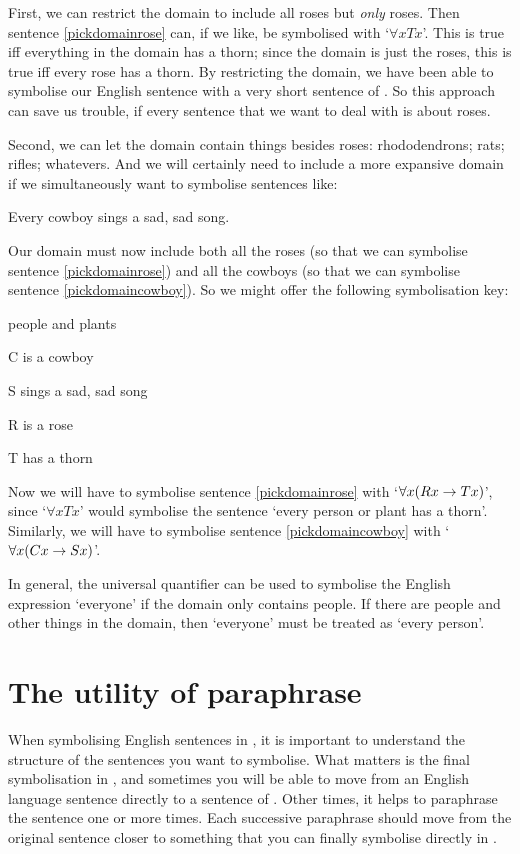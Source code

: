 First, we can restrict the domain to include all roses but \emph{only} roses. Then sentence \ref{pickdomainrose} can, if we like, be symbolised with `$\forall x Tx$'. This is true iff everything in the domain has a thorn; since the domain is just the roses, this is true iff every rose has a thorn. By restricting the domain, we have been able to symbolise our English sentence with a very short sentence of \FOL. So this approach can save us trouble, if every sentence that we want to deal with is about roses.

Second, we can let the domain contain things besides roses: rhododendrons; rats; rifles; whatevers.  And we will certainly need to include a more expansive domain if we simultaneously want to symbolise sentences like:
	\begin{earg}
		\item[\ex{pickdomaincowboy}] Every cowboy sings a sad, sad song.
	\end{earg}
Our domain must now include both all the roses (so that we can symbolise sentence \ref{pickdomainrose}) and all the cowboys (so that we can symbolise sentence \ref{pickdomaincowboy}). So we might offer the following symbolisation key:
	\begin{ekey}
		\item[\text{domain}] people and plants
		\item[C\meta{x}]  is a cowboy
		\item[S\meta{x}]  sings a sad, sad song
		\item[R\meta{x}]  is a rose
		\item[T\meta{x}]  has a thorn
	\end{ekey}
Now we will have to symbolise sentence \ref{pickdomainrose} with `$\forall x (Rx \rightarrow Tx)$', since `$\forall x Tx$' would symbolise the sentence `every person or plant has a thorn'. Similarly, we will have to symbolise sentence \ref{pickdomaincowboy} with `$\forall x (Cx \rightarrow Sx)$'. 

In general, the universal quantifier can be used to symbolise the English expression `everyone' if the domain only contains people. If there are people and other things in the domain, then `everyone' must be treated as `every person'.


\section{The utility of paraphrase}
When symbolising English sentences in \FOL, it is important to understand the structure of the sentences you want to symbolise. What matters is the final symbolisation in \FOL, and sometimes you will be able to move from an English language sentence directly to a sentence of \FOL. Other times, it helps to paraphrase the sentence one or more times. Each successive paraphrase should move from the original sentence closer to something that you can finally symbolise directly in \FOL.

